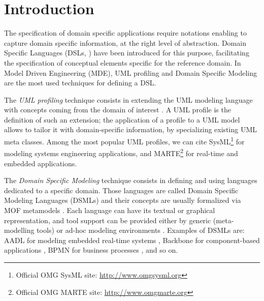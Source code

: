 \section{Introduction}\label{sec:intro}

The specification of domain specific applications require notations enabling to capture domain specific information, at the right level of abstraction. Domain Specific Languages (DSLs, \cite{FowlerBook}) have been introduced for this purpose, facilitating the specification of conceptual elements specific for the reference domain. In Model Driven Engineering (MDE), UML profiling \cite{UML} and Domain Specific Modeling \cite{DSML} are the most used techniques for defining a DSL.

The \textit{UML profiling} technique consists in extending the UML modeling language with concepts coming from
the domain of interest \cite{UMLprofile}.
A UML profile is the definition of such an extension; the application of a profile to a UML model allows to tailor it with domain-specific information, by specializing existing UML meta classes. Among the most popular UML profiles, we can cite SysML\footnote{Official OMG SysML site: \small{\url{http://www.omgsysml.org}}}
for modeling systems engineering applications, and 
MARTE\footnote{Official OMG MARTE site: \small{\url{http://www.omgmarte.org}}} for real-time and embedded applications. 

The \textit{Domain Specific Modeling} technique consists in defining and using languages dedicated to a specific domain.
Those languages are called Domain Specific Modeling Languages (DSMLs) and their concepts are usually formalized  via MOF metamodels \cite{MOF}.
Each language can have its textual or graphical representation, and tool support can be provided either by generic (meta-modelling tools) or
ad-hoc modeling environments \cite{DSML}.
Examples of DSMLs are: AADL for modeling embedded real-time systems \cite{aadl}, Backbone for component-based applications \cite{backbone}, BPMN for business processes \cite{BPMN}, and so on.


